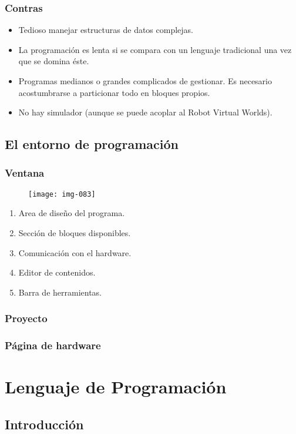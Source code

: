 \documentclass[12pt,a4paper]{article}
\begin{document}
\subsubsection{Contras}
\begin{itemize}
\item Tedioso manejar estructuras de datos complejas.
\item La programación es lenta si se compara con un lenguaje tradicional una vez
que se domina éste.
\item Programas medianos o grandes complicados de gestionar. Es necesario
acostumbrarse a particionar todo en
bloques propios.
\item No hay simulador (aunque se puede acoplar al Robot Virtual Worlds).
\end{itemize}
\subsection{El entorno de programación}
\subsubsection{Ventana}

\begin{figure}[h]
	\texttt{[image: img-083]}
	\centering
\end{figure}

\begin{enumerate}
\item Area de diseño del programa.
\item Sección de bloques disponibles.
\item Comunicación con el hardware.
\item Editor de contenidos.
\item Barra de herramientas.
\end{enumerate}

\subsubsection{Proyecto}
\subsubsection{Página de hardware}
\section{Lenguaje de Programación}
\subsection{Introducción}
\end{document}
